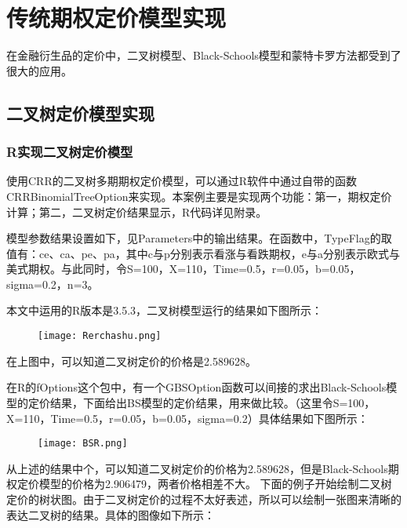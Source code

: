 

\chapter{传统期权定价模型实现}
	在金融衍生品的定价中，二叉树模型、Black-Schools模型和蒙特卡罗方法都受到了很大的应用。


\section{二叉树定价模型实现}

\subsection{R实现二叉树定价模型}
	使用CRR的二叉树多期期权定价模型，可以通过R软件中通过自带的函数CRRBinomialTreeOption来实现。本案例主要是实现两个功能：第一，期权定价计算；第二，二叉树定价结果显示，R代码详见附录。
	
	模型参数结果设置如下，见Parameters中的输出结果。在函数中，TypeFlag的取值有：ce、ca、pe、pa，其中c与p分别表示看涨与看跌期权，e与a分别表示欧式与美式期权。与此同时，令S=100，X=110，Time=0.5，r=0.05，b=0.05，sigma=0.2，n=3。
	
	本文中运用的R版本是3.5.3，二叉树模型运行的结果如下图所示：
	
	\begin{figure}[htb] %
		\centering
		\texttt{[image: Rerchashu.png]}
		\label{fig:xfig1}
	\end{figure}
	
	在上图中，可以知道二叉树定价的价格是2.589628。
	
	在R的fOptions这个包中，有一个GBSOption函数可以间接的求出Black-Schools模型的定价结果，下面给出BS模型的定价结果，用来做比较。（这里令S=100，X=110，Time=0.5，r=0.05，b=0.05，sigma=0.2）具体结果如下图所示：
	
	\begin{figure}[htb] %
		\centering
		\texttt{[image: BSR.png]}
		\label{fig:xfig1}
	\end{figure}

	从上述的结果中个，可以知道二叉树定价的价格为2.589628，但是Black-Schools期权定价模型的价格为2.906479，两者价格相差不大。
	下面的例子开始绘制二叉树定价的树状图。由于二叉树定价的过程不太好表述，所以可以绘制一张图来清晰的表达二叉树的结果。具体的图像如下所示：
	
